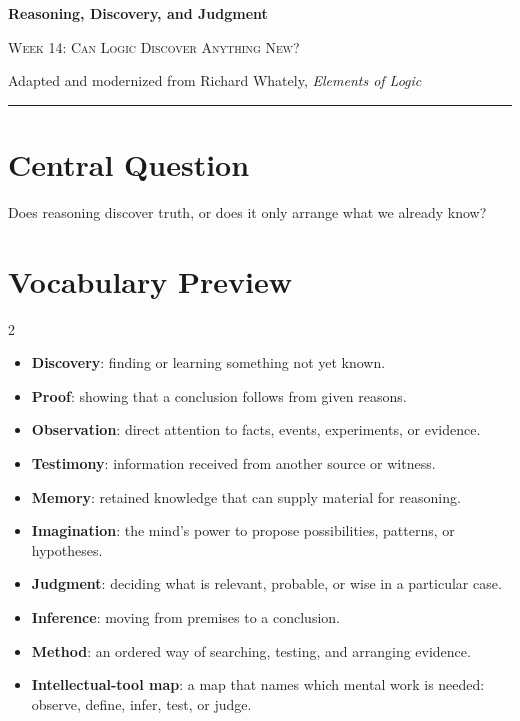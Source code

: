 \documentclass[12pt]{article}
\begin{document}
\begin{center}
{\LARGE\bfseries Reasoning, Discovery, and Judgment}\par\vspace{0.25em}
{\large\scshape Week 14: Can Logic Discover Anything New?}\par\vspace{0.5em}
{Adapted and modernized from Richard Whately, \textit{Elements of Logic}}\par\vspace{0.6em}
\rule{0.82\textwidth}{0.4pt}
\end{center}

\section*{Central Question}
Does reasoning discover truth, or does it only arrange what we already know?

\section*{Vocabulary Preview}
\begin{multicols}{2}
\begin{itemize}[leftmargin=*, itemsep=0.18em]
\item \textbf{Discovery}: finding or learning something not yet known.
\item \textbf{Proof}: showing that a conclusion follows from given reasons.
\item \textbf{Observation}: direct attention to facts, events, experiments, or evidence.
\item \textbf{Testimony}: information received from another source or witness.
\item \textbf{Memory}: retained knowledge that can supply material for reasoning.
\item \textbf{Imagination}: the mind's power to propose possibilities, patterns, or hypotheses.
\item \textbf{Judgment}: deciding what is relevant, probable, or wise in a particular case.
\item \textbf{Inference}: moving from premises to a conclusion.
\item \textbf{Method}: an ordered way of searching, testing, and arranging evidence.
\item \textbf{Intellectual-tool map}: a map that names which mental work is needed: observe, define, infer, test, or judge.
\end{itemize}
\end{multicols}
\end{document}
